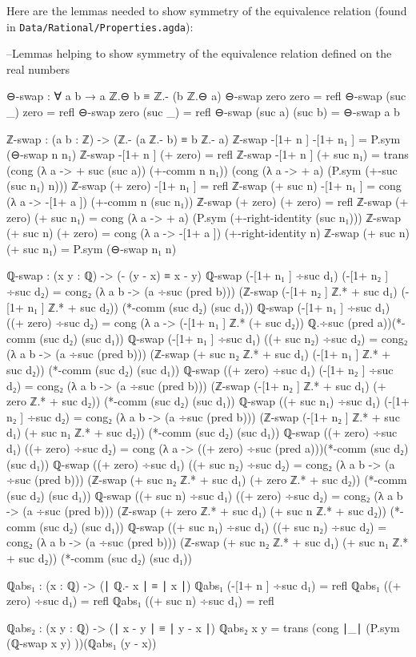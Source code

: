 \documentclass[11pt,a4paper]{article}
\begin{document}
Here are the lemmas needed to show symmetry of the equivalence relation (found in \texttt{Data/Rational/Properties.agda}):
\begin{code}
--Lemmas helping to show symmetry of the equivalence relation
 defined on the real numbers

⊖-swap : ∀ a b → a ℤ.⊖ b ≡ ℤ.- (b ℤ.⊖ a)
⊖-swap zero    zero    = refl
⊖-swap (suc _) zero    = refl
⊖-swap zero    (suc _) = refl
⊖-swap (suc a) (suc b) = ⊖-swap a b

ℤ-swap : (a b : ℤ) -> (ℤ.- (a ℤ.- b) ≡ b ℤ.- a)
ℤ-swap -[1+ n ] -[1+ n₁ ] = P.sym (⊖-swap n n₁)
ℤ-swap -[1+ n ] (+ zero) = refl
ℤ-swap -[1+ n ] (+ suc n₁) = trans (cong (λ a -> + suc (suc a)) 
   (+-comm n n₁)) (cong (λ a -> + a) (P.sym (+-suc (suc n₁) n)))
ℤ-swap (+ zero) -[1+ n₁ ] = refl
ℤ-swap (+ suc n) -[1+ n₁ ] = cong (λ a -> -[1+ a ]) (+-comm n (suc n₁))
ℤ-swap (+ zero) (+ zero) = refl
ℤ-swap (+ zero) (+ suc n₁) = cong (λ a -> + a) (P.sym (+-right-identity (suc n₁)))
ℤ-swap (+ suc n) (+ zero) = cong (λ a -> -[1+ a ]) (+-right-identity n)
ℤ-swap (+ suc n) (+ suc n₁) = P.sym (⊖-swap n₁ n)

ℚ-swap : (x y : ℚ) -> (- (y - x) ≡ x - y)
ℚ-swap (-[1+ n₁ ] ÷suc d₁) (-[1+ n₂ ] ÷suc d₂) = cong₂ (λ a b -> (a ÷suc (pred b))) (ℤ-swap (-[1+ n₂ ] ℤ.* + suc d₁) (-[1+ n₁ ] ℤ.* + suc d₂)) (*-comm (suc d₂) (suc d₁))
ℚ-swap (-[1+ n₁ ] ÷suc d₁) ((+ zero) ÷suc d₂) = cong (λ a -> (-[1+ n₁ ] ℤ.* (+ suc d₂)) ℚ.÷suc (pred a))(*-comm (suc d₂) (suc d₁))
ℚ-swap (-[1+ n₁ ] ÷suc d₁) ((+ suc n₂) ÷suc d₂) = cong₂ (λ a b -> (a ÷suc (pred b))) (ℤ-swap (+ suc n₂ ℤ.* + suc d₁) (-[1+ n₁ ] ℤ.* + suc d₂)) (*-comm (suc d₂) (suc d₁))
ℚ-swap ((+ zero) ÷suc d₁) (-[1+ n₂ ] ÷suc d₂) = cong₂ (λ a b -> (a ÷suc (pred b))) (ℤ-swap (-[1+ n₂ ] ℤ.* + suc d₁) (+ zero ℤ.* + suc d₂)) (*-comm (suc d₂) (suc d₁))
ℚ-swap ((+ suc n₁) ÷suc d₁) (-[1+ n₂ ] ÷suc d₂) = cong₂ (λ a b -> (a ÷suc (pred b))) (ℤ-swap (-[1+ n₂ ] ℤ.* + suc d₁) (+ suc n₁ ℤ.* + suc d₂)) (*-comm (suc d₂) (suc d₁))
ℚ-swap ((+ zero) ÷suc d₁) ((+ zero) ÷suc d₂) = cong (λ a -> ((+ zero) ÷suc (pred a)))(*-comm (suc d₂) (suc d₁))
ℚ-swap ((+ zero) ÷suc d₁) ((+ suc n₂) ÷suc d₂) = cong₂ (λ a b -> (a ÷suc (pred b))) (ℤ-swap (+ suc n₂ ℤ.* + suc d₁) (+ zero ℤ.* + suc d₂)) (*-comm (suc d₂) (suc d₁))
ℚ-swap ((+ suc n) ÷suc d₁) ((+ zero) ÷suc d₂) = cong₂ (λ a b -> (a ÷suc (pred b))) (ℤ-swap (+ zero ℤ.* + suc d₁) (+ suc n ℤ.* + suc d₂)) (*-comm (suc d₂) (suc d₁))
ℚ-swap ((+ suc n₁) ÷suc d₁) ((+ suc n₂) ÷suc d₂) = cong₂ (λ a b -> (a ÷suc (pred b))) (ℤ-swap (+ suc n₂ ℤ.* + suc d₁) (+ suc n₁ ℤ.* + suc d₂)) (*-comm (suc d₂) (suc d₁))

ℚabs₁ : (x : ℚ) -> (∣ ℚ.- x ∣ ≡ ∣ x ∣)
ℚabs₁ (-[1+ n ] ÷suc d₁) = refl
ℚabs₁ ((+ zero) ÷suc d₁) = refl
ℚabs₁ ((+ suc n) ÷suc d₁) = refl

ℚabs₂ : (x y : ℚ) -> (∣ x - y ∣ ≡ ∣ y - x ∣)
ℚabs₂ x y = trans (cong ∣_∣ (P.sym (ℚ-swap x y) ))(ℚabs₁ (y - x))
\end{code}
\end{document}
